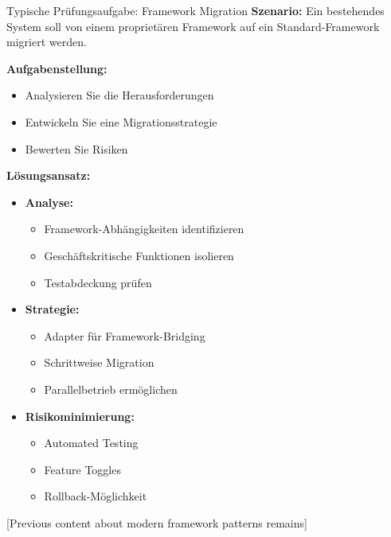 \begin{example}{Typische Prüfungsaufgabe: Framework Migration}
\textbf{Szenario:}
Ein bestehendes System soll von einem proprietären Framework auf ein Standard-Framework 
migriert werden.

\textbf{Aufgabenstellung:}
\begin{itemize}
    \item Analysieren Sie die Herausforderungen
    \item Entwickeln Sie eine Migrationsstrategie
    \item Bewerten Sie Risiken
\end{itemize}

\textbf{Lösungsansatz:}
\begin{itemize}
    \item \textbf{Analyse:}
    \begin{itemize}
        \item Framework-Abhängigkeiten identifizieren
        \item Geschäftskritische Funktionen isolieren
        \item Testabdeckung prüfen
    \end{itemize}
    
    \item \textbf{Strategie:}
    \begin{itemize}
        \item Adapter für Framework-Bridging
        \item Schrittweise Migration
        \item Parallelbetrieb ermöglichen
    \end{itemize}
    
    \item \textbf{Risikominimierung:}
    \begin{itemize}
        \item Automated Testing
        \item Feature Toggles
        \item Rollback-Möglichkeit
    \end{itemize}
\end{itemize}
\end{example}

[Previous content about modern framework patterns remains]